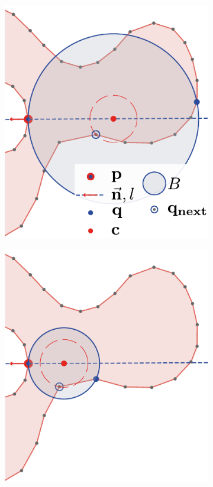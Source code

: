 \begin{figure}[tbp]
\begin{subfigure}{0.245\linewidth}
		\includegraphics[width=\textwidth]{figs/fullBallShrink_2.pdf}
		\label{fig:fullBallShrink_2}
	\end{subfigure}
	\begin{subfigure}{0.245\linewidth}
		\includegraphics[width=\textwidth]{figs/fullBallShrink_3.pdf}

\end{subfigure}
\end{figure}
